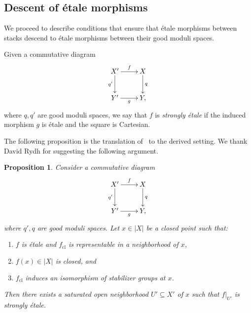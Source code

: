 \documentclass[a4paper,twoside,11pt]{amsart}
\theoremstyle{plain}
\newtheorem{proposition}[theorem]{Proposition}
\theoremstyle{definition}
\theoremstyle{remark}
\numberwithin{equation}{section}
\newcommand{\cl}{\mathrm{cl}} %
\begin{document}
\subsection{Descent of \'{e}tale morphisms} We proceed to describe conditions that ensure that \'{e}tale morphisms between stacks descend to \'{e}tale morphisms between their good moduli spaces.

Given a commutative diagram
\begin{align*}
        \xymatrix{
        X' \ar[r]^-{f} \ar[d]_-{q'} & X \ar[d]^-{q} \\
        Y' \ar[r]_-{g} & Y,
        }
\end{align*}
where $q,q'$ are good moduli spaces, we say that $f$ is \emph{strongly \'{e}tale} if the induced morphism $g$ is \'{e}tale and the square is Cartesian.

The following proposition is the translation of~\cite[Theorem~3.14]{AHR2} to the derived setting. We thank David Rydh for suggesting the following argument.

\begin{proposition}
    Consider a commutative diagram
    \begin{align} \label{eq:truncated Cartesian sq}
        \xymatrix{
        X' \ar[r]^-{f} \ar[d]_-{q'} & X \ar[d]^-{q} \\
        Y' \ar[r]_-{g} & Y,
        }
    \end{align}
    where $q',q$ are good moduli spaces. Let $x \in |X|$ be a closed point such that:
    \begin{enumerate}
        \item $f$ is \'{e}tale and $f_\cl$ is representable in a neighborhood of $x$,
        \item $f(x) \in |X|$ is closed, and
        \item $f_\cl$ induces an isomorphism of stabilizer groups at $x$.
    \end{enumerate}
    Then there exists a saturated open neighborhood $U' \subseteq X'$ of $x$ such that $f|_{U'}$ is strongly \'{e}tale.
\end{proposition}
\end{document}
